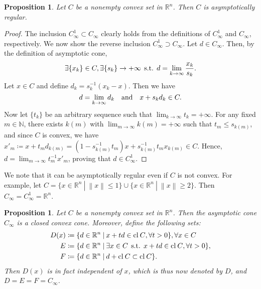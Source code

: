 \documentclass[a4paper,11pt, oneside]{book}
\newtheorem{prop}[thm]{Proposition}
\theoremstyle{definition}
\newcommand{\NaturalNumberSet}{\mathbb{N}}
\newcommand{\NDemenstionalRealEuclideanSpace}{\mathbb{R}^n}
\newcommand{\Closure}[1]{\text{\rm cl\:${#1}$}} %
\newcommand{\SuchThat}{\:\text{\rm s.t.}\:}
\newcommand{\SetForm}[2]{
  \{{#1}\:|\:{#2}\}
}
\begin{document}
\begin{prop}\label{ConvexSetIsAsymptoticallyRegular}
  Let $C$ be a nonempty convex set in $\NDemenstionalRealEuclideanSpace$. Then $C$ is asymptotically regular.
\end{prop}

\begin{proof}
  The inclusion $C^1_{\infty} \subset C_{\infty}$ clearly holds from the definitions of $C^1_{\infty}$ and $C_{\infty}$, respectively. We now show the reverse inclusion $C^1_{\infty} \supset C_{\infty}$. Let $d \in C_{\infty}$. Then, by the definition of asymptotic cone,
  \begin{equation}
    \exists \{x_k\} \in C, \exists \{s_k\} \to +\infty \:\SuchThat\: d = \lim_{k \to \infty} \frac{x_k}{s_k}. \notag
  \end{equation}
  Let $x \in C$ and define $d_k = s_k^{-1}(x_k-x)$. Then we have
  \begin{equation}
    d = \lim_{k \to \infty} d_k \quad \text{and} \quad x + s_k d_k \in C. \notag
  \end{equation}
  Now let $\{t_k\}$ be an arbitrary sequence such that $\lim_{k \to \infty} t_k = +\infty$. For any fixed $m \in \NaturalNumberSet$, there exists $k(m)$ with $\lim_{m \to \infty} k(m) = +\infty$ such that $t_m \leq s_{k(m)}$, and since $C$ is convex, we have $x'_m \coloneqq x +t_m d_{k(m)} = (1-s_{k(m)}^{-1} t_m)x + s_{k(m)}^{-1} t_m x_{k(m)} \in C$. Hence, $d = \lim_{m \to \infty} t_m^{-1} x'_m$, proving that $d \in C^1_{\infty}$.
\end{proof}

We note that it can be asymptotically regular even if $C$ is not convex. For example, let $C = \SetForm{x \in \NDemenstionalRealEuclideanSpace}{\left\lVert x \right\rVert \leq 1} \cup \SetForm{x \in \NDemenstionalRealEuclideanSpace}{\left\lVert x \right\rVert \geq 2}$. Then $C_{\infty} = C_{\infty}^1 = \NDemenstionalRealEuclideanSpace$.

\begin{prop}\label{RepresentationOfAsymptoticCone}
  Let $C$ be a nonempty convex set in $\NDemenstionalRealEuclideanSpace$. Then the asymptotic cone $C_{\infty}$ is a closed convex cone. Moreover, define the following sets:
  \begin{equation}
    \begin{split}
      D(x) &\coloneqq \SetForm{d \in \NDemenstionalRealEuclideanSpace}{x+td \in \Closure{C}, \forall t>0}, \forall x \in C \\
      E &\coloneqq \SetForm{d \in \NDemenstionalRealEuclideanSpace}{\exists x \in C \:\SuchThat\: x+td \in \Closure{C}, \forall t>0}, \\
      F &\coloneqq \SetForm{d \in \NDemenstionalRealEuclideanSpace}{d + \Closure{C} \subset \Closure{C}}. \notag
    \end{split}
  \end{equation}
  Then $D(x)$ is in fact independent of $x$, which is thus now denoted by $D$, and $D = E = F = C_{\infty}$.
\end{prop}
\end{document}

